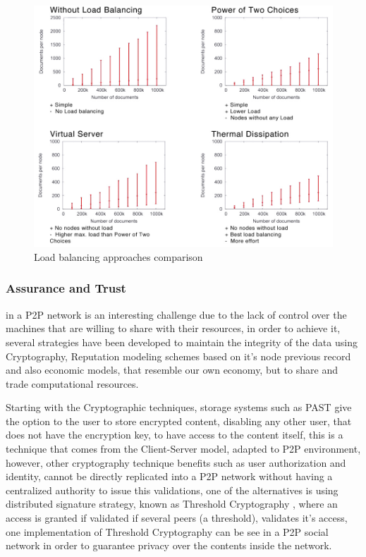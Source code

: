 \begin{figure}[hb]
    \centering
    \includegraphics[width=1\textwidth]{img/lb.jpg}
    \caption{Load balancing approaches comparison}
    \label{fig:lbcomp}
\end{figure}

\subsubsection{Assurance and Trust}\label{par:Assurance and Trust}

in a P2P network is an interesting challenge due to the lack of control over the machines that are willing to share with their resources, in order to achieve it, several strategies have been developed to maintain the integrity of the data using Cryptography, Reputation modeling schemes based on it's node previous record and also economic models, that resemble our own economy, but to share and trade computational resources.

Starting with the Cryptographic techniques, storage systems such as PAST give the option to the user to store encrypted content, disabling any other user, that does not have the encryption key, to have access to the content itself, this is a technique that comes from the Client-Server model, adapted to P2P environment, however, other cryptography technique benefits such as user authorization and identity, cannot be directly replicated into a P2P network without having a centralized authority to issue this validations, one of the alternatives is using distributed signature strategy, known as Threshold Cryptography \cite{Desmedt;1998}, where an access is granted if validated if several peers (a threshold), validates it's access, one implementation of Threshold Cryptography can be see in a P2P social network\cite{Afify} in order to guarantee privacy over the contents inside the network. 


